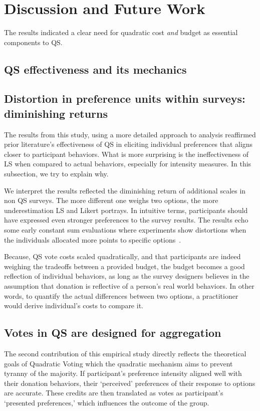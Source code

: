 \section{Discussion and Future Work}
\label{sec:discussion}

The results indicated a clear need for quadratic cost \emph{and} budget as essential components to QS.

\subsection{QS effectiveness and its mechanics}


\subsection{Distortion in preference units within surveys: diminishing returns}
The results from this study, using a more detailed approach to analysis reaffirmed prior literature's effectiveness of QS in eliciting individual preferences that aligns closer to participant behaviors. What is more surprising is the ineffectiveness of LS when compared to actual behaviors, especially for intensity measures. In this subsection, we try to explain why.

We interpret the results reflected the diminishing return of additional scales in non QS surveys. The more different one weighs two options, the more underestimation LS and Likert portrays. In intuitive terms, participants should have expressed even stronger preferences to the survey results. The results echo some early constant sum evaluations where experiments show distortions when the individuals allocated more points to specific options~\cite{}.

Because, QS vote costs scaled quadratically, and that participants are indeed weighing the tradeoffs between a provided budget, the budget becomes a good reflection of individual behaviors, as long as the survey designers believes in the assumption that donation is reflective of a person's real world behaviors. In other words, to quantify the actual differences between two options, a practitioner would derive individual's costs to compare it.

\subsection{Votes in QS are designed for aggregation}
The second contribution of this empirical study directly reflects the theoretical goals of Quadratic Voting which the quadratic mechanism aims to prevent tyranny of the majority. If participant's preference intensity aligned well with their donation behaviors, their `perceived' preferences of their response to options are accurate. These credits are then translated as votes as participant's `presented preferences,' which influences the outcome of the group.




